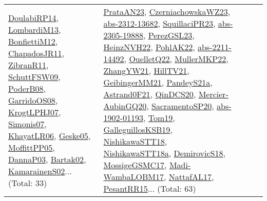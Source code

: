{\begin{longtable}{lp{3cm}>{\raggedright}p{6cm}>{\raggedright}p{6cm}p{8cm}}
\href{papers/DoulabiRP14.pdf}{DoulabiRP14}\cite{DoulabiRP14}, \href{papers/LombardiM13.pdf}{LombardiM13}\cite{LombardiM13}, \href{papers/BonfiettiM12.pdf}{BonfiettiM12}\cite{BonfiettiM12}, \href{papers/ChapadosJR11.pdf}{ChapadosJR11}\cite{ChapadosJR11}, \href{papers/ZibranR11.pdf}{ZibranR11}\cite{ZibranR11}, \href{papers/SchuttFSW09.pdf}{SchuttFSW09}\cite{SchuttFSW09}, \href{papers/PoderB08.pdf}{PoderB08}\cite{PoderB08}, \href{articles/GarridoOS08.pdf}{GarridoOS08}\cite{GarridoOS08}, \href{papers/KrogtLPHJ07.pdf}{KrogtLPHJ07}\cite{KrogtLPHJ07}, \href{articles/Simonis07.pdf}{Simonis07}\cite{Simonis07}, \href{articles/KhayatLR06.pdf}{KhayatLR06}\cite{KhayatLR06}, \href{papers/Geske05.pdf}{Geske05}\cite{Geske05}, \href{papers/MoffittPP05.pdf}{MoffittPP05}\cite{MoffittPP05}, \href{papers/DannaP03.pdf}{DannaP03}\cite{DannaP03}, \href{papers/Bartak02.pdf}{Bartak02}\cite{Bartak02}, \href{papers/KamarainenS02.pdf}{KamarainenS02}\cite{KamarainenS02}... (Total: 33) & \href{articles/PrataAN23.pdf}{PrataAN23}\cite{PrataAN23}, \href{articles/CzerniachowskaWZ23.pdf}{CzerniachowskaWZ23}\cite{CzerniachowskaWZ23}, \href{articles/abs-2312-13682.pdf}{abs-2312-13682}\cite{abs-2312-13682}, \href{papers/SquillaciPR23.pdf}{SquillaciPR23}\cite{SquillaciPR23}, \href{articles/abs-2305-19888.pdf}{abs-2305-19888}\cite{abs-2305-19888}, \href{papers/PerezGSL23.pdf}{PerezGSL23}\cite{PerezGSL23}, \href{articles/HeinzNVH22.pdf}{HeinzNVH22}\cite{HeinzNVH22}, \href{articles/PohlAK22.pdf}{PohlAK22}\cite{PohlAK22}, \href{articles/abs-2211-14492.pdf}{abs-2211-14492}\cite{abs-2211-14492}, \href{papers/OuelletQ22.pdf}{OuelletQ22}\cite{OuelletQ22}, \href{articles/MullerMKP22.pdf}{MullerMKP22}\cite{MullerMKP22}, \href{articles/ZhangYW21.pdf}{ZhangYW21}\cite{ZhangYW21}, \href{papers/HillTV21.pdf}{HillTV21}\cite{HillTV21}, \href{papers/GeibingerMM21.pdf}{GeibingerMM21}\cite{GeibingerMM21}, \href{articles/PandeyS21a.pdf}{PandeyS21a}\cite{PandeyS21a}, \href{papers/Astrand0F21.pdf}{Astrand0F21}\cite{Astrand0F21}, \href{articles/QinDCS20.pdf}{QinDCS20}\cite{QinDCS20}, \href{papers/Mercier-AubinGQ20.pdf}{Mercier-AubinGQ20}\cite{Mercier-AubinGQ20}, \href{articles/SacramentoSP20.pdf}{SacramentoSP20}\cite{SacramentoSP20}, \href{articles/abs-1902-01193.pdf}{abs-1902-01193}\cite{abs-1902-01193}, \href{papers/Tom19.pdf}{Tom19}\cite{Tom19}, \href{papers/GalleguillosKSB19.pdf}{GalleguillosKSB19}\cite{GalleguillosKSB19}, \href{papers/NishikawaSTT18.pdf}{NishikawaSTT18}\cite{NishikawaSTT18}, \href{papers/NishikawaSTT18a.pdf}{NishikawaSTT18a}\cite{NishikawaSTT18a}, \href{papers/DemirovicS18.pdf}{DemirovicS18}\cite{DemirovicS18}, \href{papers/MossigeGSMC17.pdf}{MossigeGSMC17}\cite{MossigeGSMC17}, \href{papers/Madi-WambaLOBM17.pdf}{Madi-WambaLOBM17}\cite{Madi-WambaLOBM17}, \href{articles/NattafAL17.pdf}{NattafAL17}\cite{NattafAL17}, \href{papers/PesantRR15.pdf}{PesantRR15}\cite{PesantRR15}... (Total: 63)\\

\end{longtable}}
